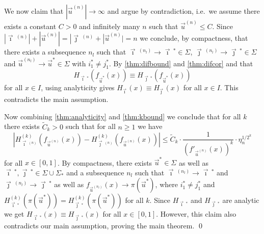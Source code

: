 \documentclass[12pt,]{article}
\theoremstyle{definition}
\theoremstyle{remark}
\newcommand{\0}{\mathbf{0}}
\newcommand{\bi}{\vec{\imath}\,}
\newcommand{\bj}{\vec{\jmath}\,}
\newcommand{\bu}{{\vec{u}}}
\begin{document}
We now claim that $|\bu^{(n)}| \to \infty$ and argue by contradiction, i.e.\ we assume there
exists a constant $C>0$ and infinitely many $n$ such that $\bu^{(n)} \leq C$. 
Since $|\bi^{(n)}|+ |\bu^{(n)}| = |\bj^{(n)}+|\bu^{(n)}| = n$ we conclude, by compactness, that
there exists a subsequence $n_l$ such that $\bi^{(n_l)} \to \bi^*\in\Sigma$,
$\bj^{(n_l)}\to\bj^*\in\Sigma$ and $\bu^{(n_l)}\to \bu^*\in\Sigma$ with $i_1^*\neq j_1^*$.
By \cref{thm:difbound} and \cref{thm:difcor} and that 
\[
  H_{\bi^*}(f_{\bu^*}(x))\equiv H_{\bj^*}(f_{\bu^*}(x)) 
\]
for all $x\in I$, using analyticity gives $H_{\bi}(x) \equiv H_{\bj}(x)$ for all $x\in I$. This
contradicts the main assumption.

Now combining \cref{thm:analyticity} and \cref{thm:kbound} we conclude that for all $k$ there
exists $\widetilde{C}_k>0$ such that for all $n\geq 1$ we have
\[
  |H_{\bi^{(n)}}^{(k)}(f_{\bu^{(n)}}(x)) - H_{\bj^{(n)}}^{(k)}(f_{\bu^{(n)}}(x))|
  \leq \widetilde{C}_k \cdot \frac{1}{(f'_{\bu^{(n)}}(x))^k}\cdot\eta_n^{1/2^k}
\]
for all $x\in[0,1]$.
By compactness, there exists $\bu^*\in\Sigma$ as well as $\bi^*,\bj^*\in\Sigma\cup\Sigma_*$ and a
subsequence $n_l$ such that $\bi^{(n_l)}\to \bi^*$ and $\bj^{(n_l)}\to \bj^*$ as well as
$f_{\bu^{(n_l)}}(x) \to \pi(\bu^*)$, where $i_1^*\neq j_1^*$ and
$H_{\bi^*}^{(k)}(\pi(\bu^*))=H_{\bj^*}^{(k)}(\pi(\bu^*))$ for all $k$.
Since $H_{\bi^*}$ and $H_{\bj^*}$ are analytic we get $H_{\bi^*}(x)\equiv H_{\bj^*}(x)$ for all
$x\in[0,1]$. However, this claim also contradicts our main assumption, proving the main theorem.
\qed
\end{document}
